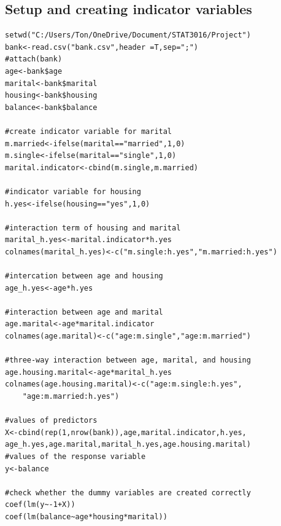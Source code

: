 \documentclass[a4page]{article}
\begin{document}
    \subsection{Setup and creating indicator variables}
    \begin{verbatim}
setwd("C:/Users/Ton/OneDrive/Document/STAT3016/Project")
bank<-read.csv("bank.csv",header =T,sep=";")
#attach(bank)
age<-bank$age
marital<-bank$marital
housing<-bank$housing
balance<-bank$balance

#create indicator variable for marital
m.married<-ifelse(marital=="married",1,0)
m.single<-ifelse(marital=="single",1,0)
marital.indicator<-cbind(m.single,m.married)

#indicator variable for housing
h.yes<-ifelse(housing=="yes",1,0)

#interaction term of housing and marital
marital_h.yes<-marital.indicator*h.yes
colnames(marital_h.yes)<-c("m.single:h.yes","m.married:h.yes")

#intercation between age and housing
age_h.yes<-age*h.yes

#interaction between age and marital
age.marital<-age*marital.indicator
colnames(age.marital)<-c("age:m.single","age:m.married")

#three-way interaction between age, marital, and housing
age.housing.marital<-age*marital_h.yes
colnames(age.housing.marital)<-c("age:m.single:h.yes",
    "age:m.married:h.yes")

#values of predictors
X<-cbind(rep(1,nrow(bank)),age,marital.indicator,h.yes,
age_h.yes,age.marital,marital_h.yes,age.housing.marital)
#values of the response variable
y<-balance

#check whether the dummy variables are created correctly
coef(lm(y~-1+X))
coef(lm(balance~age*housing*marital))
\end{verbatim}
\end{document}
